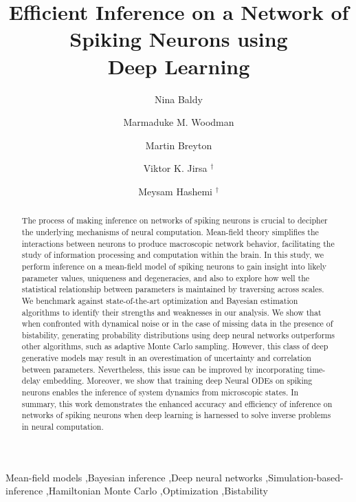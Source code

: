 \documentclass[preprint,11pt,authoryear]{elsarticle}
\begin{document}
\begin{frontmatter}


\title{Efficient Inference on a Network of Spiking Neurons using \\Deep Learning}



\rmfamily

\author[1]{Nina Baldy}
\author[2]{Marmaduke M. Woodman}
\author[3]{Martin Breyton}
\author[4]{Viktor K. Jirsa $^\dag$}
\author[5]{Meysam Hashemi $^\dag$\def\thefootnote{\dag}}


\address[1]{Aix Marseille Univ, INSERM, INS, Inst Neurosci Syst, Marseille, France}



\begin{abstract}

The process of making inference on networks of spiking neurons is crucial to decipher the underlying mechanisms of neural computation. Mean-field theory simplifies the interactions between neurons to produce macroscopic network behavior, facilitating the study of information processing and computation within the brain. In this study, we perform inference on a mean-field model of spiking neurons to gain insight into likely parameter values, uniqueness and degeneracies, and also to explore how well the statistical relationship between parameters is maintained by traversing across scales. We benchmark against state-of-the-art optimization and Bayesian estimation algorithms to identify their strengths and weaknesses in our analysis. We show that when confronted with dynamical noise or in the case of missing data in the presence of bistability, generating probability distributions using deep neural networks outperforms other algorithms, such as adaptive Monte Carlo sampling. However, this class of deep generative models may result in an overestimation of uncertainty and correlation between parameters. Nevertheless, this issue can be improved by incorporating time-delay embedding. Moreover, we show that training deep Neural ODEs on spiking neurons enables the inference of system dynamics from microscopic states. In summary, this work demonstrates the enhanced accuracy and efficiency of inference on networks of spiking neurons when deep learning is harnessed to solve inverse problems in neural computation.
\end{abstract}




\begin{keyword}
Mean-field models \sep Bayesian inference  \sep Deep neural networks  \sep Simulation-based-inference \sep Hamiltonian Monte Carlo  \sep Optimization  \sep Bistability
\end{keyword}

\end{frontmatter}
\end{document}
